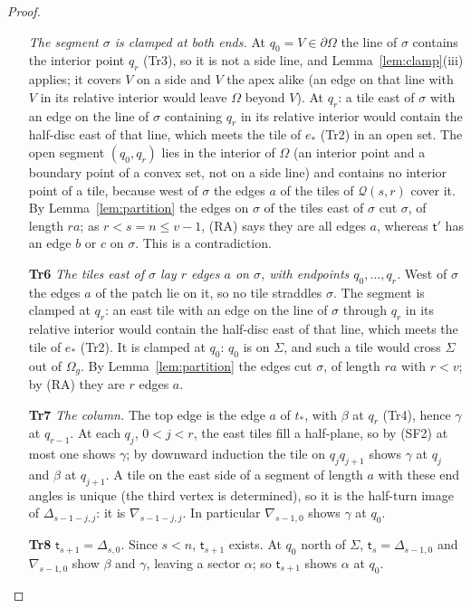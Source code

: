 \documentclass[11pt,reqno]{amsart}
\theoremstyle{plain}
\theoremstyle{definition}
\begin{document}
\begin{proof}
\begin{itemize}
\emph{The segment $\sigma$ is clamped at both ends.} At $q_0=V\in\partial\Omega$ the line of $\sigma$ contains the interior point $q_r$ (Tr3), so it is not a side line, and Lemma~\ref{lem:clamp}(iii) applies; it covers $V$ on a side and $V$ the apex alike (an edge on that line with $V$ in its relative interior would leave $\Omega$ beyond $V$). At $q_r$: a tile east of $\sigma$ with an edge on the line of $\sigma$ containing $q_r$ in its relative interior would contain the half-disc east of that line, which meets the tile of $e_\ast$ (Tr2) in an open set. The open segment $(q_0,q_r)$ lies in the interior of $\Omega$ (an interior point and a boundary point of a convex set, not on a side line) and contains no interior point of a tile, because west of $\sigma$ the edges $a$ of the tiles of $\mathcal Q(s,r)$ cover it. By Lemma~\ref{lem:partition} the edges on $\sigma$ of the tiles east of $\sigma$ cut $\sigma$, of length $ra$; as $r<s=n\le v-1$, (RA) says they are all edges $a$, whereas $\mathsf t'$ has an edge $b$ or $c$ on $\sigma$. This is a contradiction.
\item[\textbf{Tr6}] \emph{The tiles east of $\sigma$ lay $r$ edges $a$ on $\sigma$, with endpoints $q_0,\dots,q_r$.} West of $\sigma$ the edges $a$ of the patch lie on it, so no tile straddles $\sigma$. The segment is clamped at $q_r$: an east tile with an edge on the line of $\sigma$ through $q_r$ in its relative interior would contain the half-disc east of that line, which meets the tile of $e_\ast$ (Tr2). It is clamped at $q_0$: $q_0$ is on $\Sigma$, and such a tile would cross $\Sigma$ out of $\Omega_{g}$. By Lemma~\ref{lem:partition} the edges cut $\sigma$, of length $ra$ with $r<v$; by (RA) they are $r$ edges $a$.
\item[\textbf{Tr7}] \emph{The column.} The top edge is the edge $a$ of $t_\ast$, with $\beta$ at $q_r$ (Tr4), hence $\gamma$ at $q_{r-1}$. At each $q_j$, $0<j<r$, the east tiles fill a half-plane, so by (SF2) at most one shows $\gamma$; by downward induction the tile on $q_jq_{j+1}$ shows $\gamma$ at $q_j$ and $\beta$ at $q_{j+1}$. A tile on the east side of a segment of length $a$ with these end angles is unique (the third vertex is determined), so it is the half-turn image of $\Delta_{s-1-j,j}$: it is $\nabla_{s-1-j,j}$. In particular $\nabla_{s-1,0}$ shows $\gamma$ at $q_0$.
\item[\textbf{Tr8}] $\mathsf t_{s+1}=\Delta_{s,0}$. Since $s<n$, $\mathsf t_{s+1}$ exists. At $q_0$ north of $\Sigma$, $\mathsf t_s=\Delta_{s-1,0}$ and $\nabla_{s-1,0}$ show $\beta$ and $\gamma$, leaving a sector $\alpha$; so $\mathsf t_{s+1}$ shows $\alpha$ at $q_0$.

\end{itemize}
\end{proof}
\end{document}

